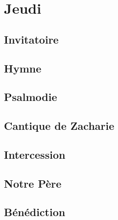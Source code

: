 \newpage
\section[Jeudi]{Jeudi}
\begin{french}
\subsection*{Invitatoire}


%

\subsection*{Hymne}


\newpage \subsection*{Psalmodie}




\newpage 


\vspace{-1em}
\subsection*{Cantique de Zacharie}


\subsection*{Intercession}


\subsection*{Notre Père}




\subsection*{Bénédiction}

\end{french}

\newpage
